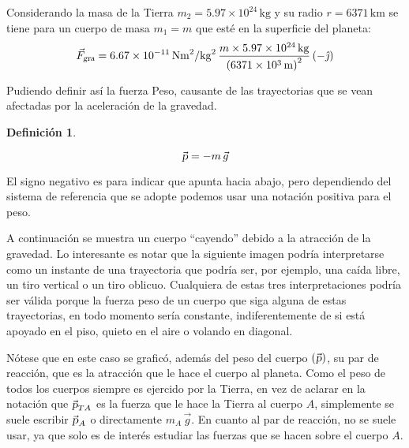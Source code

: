 \documentclass[a5paper,12pt,twoside]{book}
\newtheorem{defn}{{Definición}}[chapter]
\begin{document}
Considerando la masa de la Tierra $m_2=5.97 \times 10^{24} \, \si{\kilo\gram}$ y su radio $r=6371 \, \si{\kilo\metre}$ se tiene para un cuerpo de masa $m_1=m$ que esté en la superficie del planeta:
\begin{equation*}
    {{\vec{F}}_\textsl{{gra}}} = 6.67 \times 10^{-11} \, \si{\newton\metre^2\per\kilo\gram^2} \, \frac{m \times 5.97 \times 10^{24} \, \si{\kilo\gram}}{\left(6371 \times 10^{3} \, \si{\metre}\right)^2} \left(-\hat{\jmath}\right)
\end{equation*}

Pudiendo definir así la fuerza Peso, causante de las trayectorias que se vean afectadas por la aceleración de la gravedad.

\begin{mdframed}[style=MyFrame1]
    \begin{defn}
        \label{defn:weightForce}
    \end{defn}
    \begin{equation*}
        \Vec{\textsl{p}} = -m \, \Vec{g}
    \end{equation*}
\end{mdframed}

El signo negativo es para indicar que apunta hacia abajo, pero dependiendo del sistema de referencia que se adopte podemos usar una notación positiva para el peso.

A continuación se muestra un cuerpo ``cayendo'' debido a la atracción de la gravedad. Lo interesante es notar que la siguiente imagen podría interpretarse como un instante de una trayectoria que podría ser, por ejemplo, una caída libre, un tiro vertical o un tiro oblicuo. Cualquiera de estas tres interpretaciones podría ser válida porque la fuerza peso de un cuerpo que siga alguna de estas trayectorias, en todo momento sería constante, indiferentemente de si está apoyado en el piso, quieto en el aire o volando en diagonal.

\begin{center}
    \def\svgwidth{0.85\linewidth}
    
\end{center}

Nótese que en este caso se graficó, además del peso del cuerpo $(\Vec{\textsl{p}})$, su par de reacción, que es la atracción que le hace el cuerpo al planeta. Como el peso de todos los cuerpos siempre es ejercido por la Tierra, en vez de aclarar en la notación que $\Vec{\textsl{p}}_{TA}$ es la fuerza que le hace la Tierra al cuerpo $A$, simplemente se suele escribir $\Vec{\textsl{p}}_A$ o directamente $m_A \, \Vec{g}$. En cuanto al par de reacción, no se suele usar, ya que solo es de interés estudiar las fuerzas que se hacen sobre el cuerpo $A$.
\end{document}
